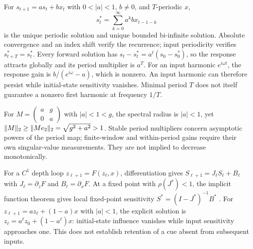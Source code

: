 \begin{remark}
\label{prop:scalar}
For $s_{t+1}=as_t+bx_t$ with $0<|a|<1$, $b\ne0$, and $T$-periodic $x$,
\[
 s_t^*=\sum_{k=0}^{\infty}a^k b x_{t-1-k}
\]
is the unique periodic solution and unique bounded bi-infinite solution.
Absolute convergence and an index shift verify the recurrence; input
periodicity verifies $s_{t+T}^*=s_t^*$. Every forward solution has
$s_t-s_t^*=a^t(s_0-s_0^*)$, so the response attracts globally and its period
multiplier is $a^T$. For an input harmonic $e^{i\omega t}$, the response gain
is $b/(e^{i\omega}-a)$, which is nonzero. An input harmonic can therefore
persist while initial-state sensitivity vanishes. Minimal period $T$ does
not itself guarantee a nonzero first harmonic at frequency $1/T$.
\end{remark}

\begin{remark}
\label{prop:nonnormal}
For $M=\left(\begin{smallmatrix}a&g\\0&a\end{smallmatrix}\right)$ with
$|a|<1<g$, the spectral radius is $|a|<1$, yet
$\lVert M \rVert_2\ge\lVert Me_2 \rVert_2=\sqrt{g^2+a^2}>1$.
Stable period multipliers concern asymptotic powers of the period map;
finite-window and within-period gains require their own singular-value
measurements. They are not implied to decrease monotonically.
\end{remark}

\begin{remark}
\label{prop:reinjection}
For a $C^1$ depth loop $z_{\ell+1}=F(z_\ell,x)$, differentiation gives
$S_{\ell+1}=J_\ell S_\ell+B_\ell$ with $J_\ell=\partial_zF$ and
$B_\ell=\partial_xF$. At a fixed point with $\rho(J^*)<1$, the implicit
function theorem gives local fixed-point sensitivity
$S^*=(I-J^*)^{-1}B^*$ \citep{deep_equilibrium}.
For $z_{\ell+1}=az_\ell+(1-a)x$ with $|a|<1$, the explicit solution is
$z_\ell=a^\ell z_0+(1-a^\ell)x$: initial-state influence vanishes while
input sensitivity approaches one. This does not establish retention of a
cue absent from subsequent inputs.
\end{remark}
